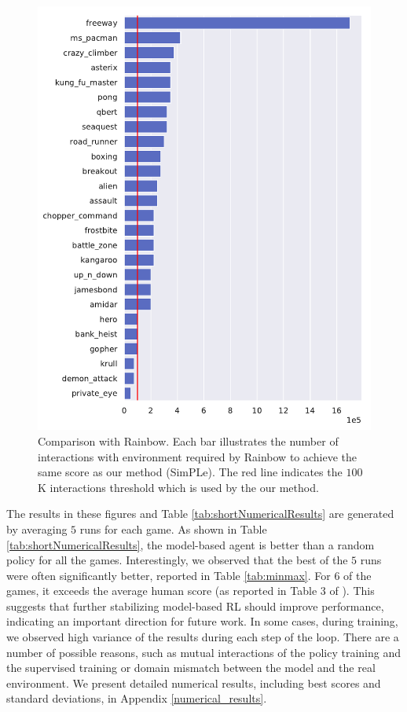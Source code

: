 \begin{figure}[t]
\centering
\includegraphics[width=1.0\columnwidth]{figures/v1_eval_longmodel_vs_rainbow-1.png}
\vspace{-0.2cm}
\caption{Comparison with Rainbow. Each bar illustrates the number of interactions with environment required by Rainbow to achieve the same score as our method (SimPLe). The red line indicates the $100$K interactions threshold which is used by the our method.} 
\label{fig:compare_dopamine}
\end{figure}

The results in these figures and Table \ref{tab:shortNumericalResults} are generated by averaging $5$ runs for each game. As shown in Table \ref{tab:shortNumericalResults}, the model-based agent is better than a random policy for all the games. Interestingly, we observed that the best of the $5$ runs were often significantly better, reported in Table \ref{tab:minmax}. For $6$ of the games, it exceeds the average human score (as reported in Table 3 of \cite{Pohlenetal2018}). This suggests that further stabilizing model-based RL should improve performance, indicating an important direction for future work. In some cases, during training, we observed high variance of the results during each step of the loop. There are a number of possible reasons, such as mutual interactions of the policy training and the supervised training or domain mismatch between the model and the real environment. We present detailed numerical results, including best scores and standard deviations, in Appendix \ref{numerical_results}.

